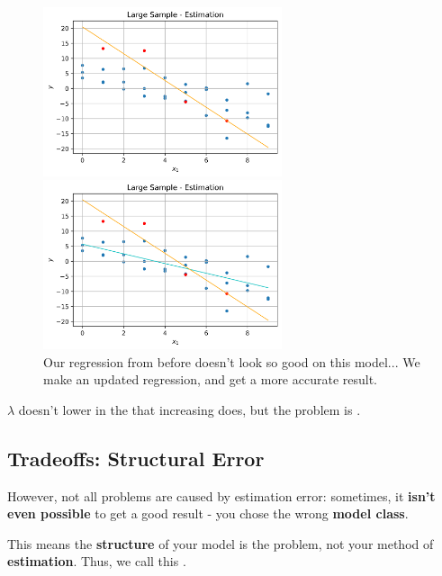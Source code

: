         \begin{figure}[H]

                \includegraphics[width=70mm,scale=0.5]{images/regression_images/Estimation_Full_Sample.png}
                
                \includegraphics[width=70mm,scale=0.5]{images/regression_images/Estimation_Full_Sample_Regression.png}
        
            \caption*{Our regression from before doesn't look so good on this model... We make an updated regression, and get a more accurate result.}
        \end{figure}
        
        \begin{clarification}
           $\lambda$ doesn't lower  in the  that increasing  does, but the problem is .
        \end{clarification}
        
    \subsection{Tradeoffs: Structural Error}
    
        However, not all problems are caused by estimation error: sometimes, it \textbf{isn't even possible} to get a good result - you chose the wrong \textbf{model class}.
        
        This means the \textbf{structure} of your model is the problem, not your method of \textbf{estimation}. Thus, we call this .\\
        
